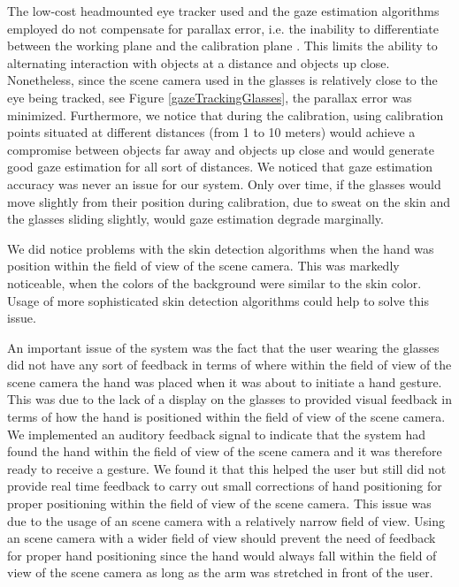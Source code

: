 \documentclass[jou,a4paper,notxfonts]{apa}
\begin{document}
The low-cost headmounted eye tracker used and the gaze estimation algorithms employed do not compensate for parallax
error, i.e. the inability to differentiate between the working plane and the calibration plane
\cite{mardanbegi2012parallax}. This limits the ability to alternating interaction with objects at a distance and objects
up close. Nonetheless, since the scene camera used in the glasses is relatively close to the eye being tracked, see Figure
\ref{gazeTrackingGlasses}, the parallax error was minimized. Furthermore, we notice that during the calibration, using
calibration points situated at different distances (from 1 to 10 meters) would achieve a compromise between objects
far away and objects up close and would generate good gaze estimation for all sort of distances. We noticed that
gaze estimation accuracy was never an issue for our system. Only over time, if the glasses would move slightly from
their position during calibration, due to sweat on the skin and the glasses sliding slightly, would gaze
estimation degrade marginally.


We did notice problems with the skin detection algorithms when the hand was position within the field of view of the
scene camera. This was markedly noticeable, when the colors of the background were similar to the skin color. Usage of
more sophisticated skin detection algorithms could help to solve this issue.


An important issue of the system was the fact that the user wearing the glasses did not have any sort of feedback in
terms of where within the field of view of the scene camera the hand was placed when it was about to initiate a hand
gesture. This was due to the lack of a display on the glasses to provided visual feedback in terms of how the hand is
positioned within the field of view of the scene camera. We implemented an auditory feedback signal to indicate
that the system had found the hand within the field of view of the scene camera and it was therefore ready to receive a
gesture. We found it that this helped the user but still did not provide real time feedback to carry out small
corrections of hand positioning for proper positioning within the field of view of the scene camera. This issue was due
to the usage of an scene camera with a relatively narrow field of view. Using an scene camera with a wider field of view
should prevent the need of feedback for proper hand positioning since the hand would always fall within the field of
view of the scene camera as long as the arm was stretched in front of the user.
\end{document}
